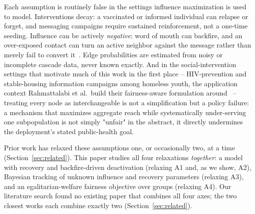 \documentclass[journal]{IEEEtran}
\begin{document}
Each assumption is routinely false in the settings influence maximization is
used to model. Interventions decay: a vaccinated or informed individual can
relapse or forget, and messaging campaigns require sustained reinforcement,
not a one-time seeding. Influence can be actively \emph{negative}: word of
mouth can backfire, and an over-exposed contact can turn an active neighbor
against the message rather than merely fail to convert
it~\cite{chen2011influence,he2012influence,li2014influence}. Edge
probabilities are estimated from noisy or incomplete cascade data, never
known exactly. And in the social-intervention settings that motivate much of
this work in the first place -- HIV-prevention and stable-housing
information campaigns among homeless youth, the application context
Rahmattalabi et al.\ build their fairness-aware
formulation around~\cite{rahmattalabi2021fair} -- treating every node as
interchangeable is not a simplification but a policy failure: a mechanism
that maximizes aggregate reach while systematically under-serving one
subpopulation is not simply "unfair" in the abstract, it directly
undermines the deployment's stated public-health goal.

Prior work has relaxed these assumptions one, or occasionally two, at a
time (Section~\ref{sec:related}). This paper studies all four relaxations
\emph{together}: a model with recovery and backfire-driven deactivation
(relaxing A1 and, as we show, A2), Bayesian tracking of unknown influence
and recovery parameters (relaxing A3), and an egalitarian-welfare
fairness objective over groups (relaxing A4). Our literature search found no
existing paper that combines all four axes; the two closest works each
combine exactly two (Section~\ref{sec:related}).
\end{document}
